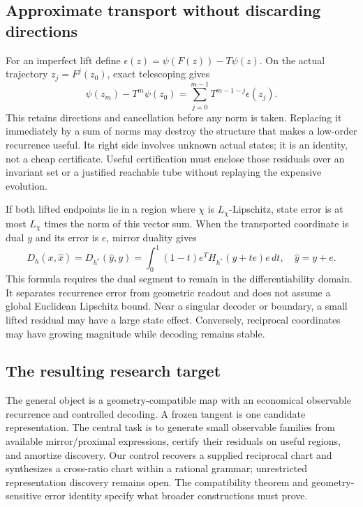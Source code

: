 \subsection{Approximate transport without discarding directions}
For an imperfect lift define $\epsilon(z)=\psi(F(z))-T\psi(z)$.
On the actual trajectory $z_j=F^j(z_0)$, exact telescoping gives
\begin{equation}
 \psi(z_m)-T^m\psi(z_0)
   =\sum_{j=0}^{m-1}T^{m-1-j}\epsilon(z_j).
 \label{eq:directional-lift-defect}
\end{equation}
This retains directions and cancellation before any norm is taken. Replacing
it immediately by a sum of norms may destroy the structure that makes a
low-order recurrence useful. Its right side involves unknown actual states;
it is an identity, not a cheap certificate. Useful certification must enclose
those residuals over an invariant set or a justified reachable tube without
replaying the expensive evolution.

If both lifted endpoints lie in a region where $\chi$ is $L_\chi$-Lipschitz,
state error is at most $L_\chi$ times the norm of this vector sum. When the
transported coordinate is dual $y$ and its error is $e$, mirror duality gives
\begin{equation}
 D_h(x,\widehat x)=D_{h^*}(\widehat y,y)
 =\int_0^1(1-t)e^TH_{h^*}(y+te)e\,dt,
 \quad \widehat y=y+e.
 \label{eq:geometric-readout}
\end{equation}
This formula requires the dual segment to remain in the differentiability
domain. It separates recurrence error from geometric readout and does not
assume a global Euclidean Lipschitz bound. Near a singular decoder or boundary,
a small lifted residual may have a large state effect. Conversely, reciprocal
coordinates may have growing magnitude while decoding remains stable.



\subsection{The resulting research target}
The general object is a geometry-compatible map with an economical observable
recurrence and controlled decoding. A frozen tangent is one candidate
representation. The central task is to generate small observable families
from available mirror/proximal expressions, certify their residuals on useful
regions, and amortize discovery. Our control recovers a supplied reciprocal
chart and synthesizes a cross-ratio chart within a rational grammar; unrestricted
representation discovery remains open. The compatibility theorem and
geometry-sensitive error identity specify what broader constructions must prove.
